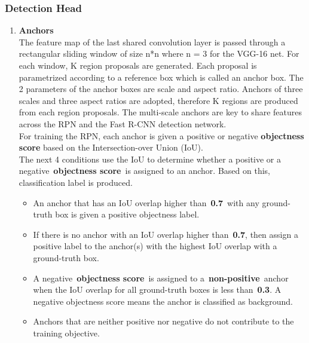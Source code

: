         \subsubsection{Detection Head}
            \begin{enumerate}
                \item \textbf{Anchors} \\ 
                    \vspace{3mm}
                    The feature map of the last shared convolution layer is passed through a rectangular sliding window of size n*n where n = 3 for the VGG-16 net. For each window, K region proposals are generated. Each proposal is parametrized according to a reference box which is called an anchor box. The 2 parameters of the anchor boxes are scale and aspect ratio. Anchors of three scales and three aspect ratios are adopted, therefore K regions are produced from each region proposals. The multi-scale anchors are key to share features across the RPN and the Fast R-CNN detection network. \\ 
                    \vspace{3mm}
                    For training the RPN, each anchor is given a positive or negative \textbf{objectness score} based on the Intersection-over Union (IoU). \\ 
                    \vspace{3mm}
                    The next 4 conditions use the IoU to determine whether a positive or a negative \textbf{objectness score} is assigned to an anchor. Based on this, classification label is produced.
                    \begin{itemize}
                        \item An anchor that has an IoU overlap higher than \textbf{0.7} with any ground-truth box is given a positive objectness label.
                        \item If there is no anchor with an IoU overlap higher than \textbf{0.7}, then assign a positive label to the anchor(s) with the highest IoU overlap with a ground-truth box.
                        \item A negative \textbf{objectness score} is assigned to a \textbf{non-positive} anchor when the IoU overlap for all ground-truth boxes is less than \textbf{0.3}. A negative objectness score means the anchor is classified as background.
                        \item Anchors that are neither positive nor negative do not contribute to the training objective.

\end{itemize}
\end{enumerate}
